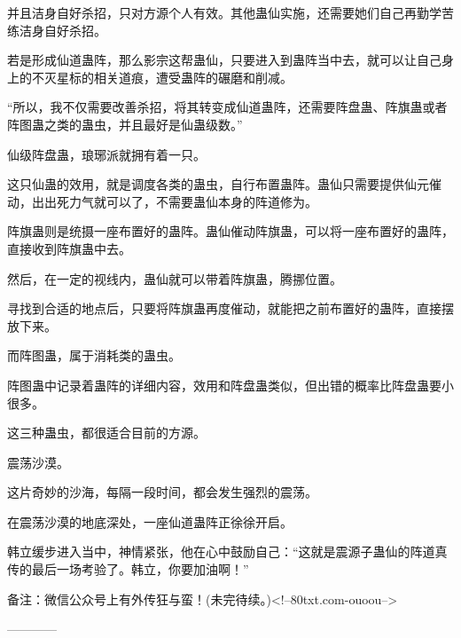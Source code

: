\begin{this_body}
并且洁身自好杀招，只对方源个人有效。其他蛊仙实施，还需要她们自己再勤学苦练洁身自好杀招。

若是形成仙道蛊阵，那么影宗这帮蛊仙，只要进入到蛊阵当中去，就可以让自己身上的不灭星标的相关道痕，遭受蛊阵的碾磨和削减。

“所以，我不仅需要改善杀招，将其转变成仙道蛊阵，还需要阵盘蛊、阵旗蛊或者阵图蛊之类的蛊虫，并且最好是仙蛊级数。”

仙级阵盘蛊，琅琊派就拥有着一只。

这只仙蛊的效用，就是调度各类的蛊虫，自行布置蛊阵。蛊仙只需要提供仙元催动，出出死力气就可以了，不需要蛊仙本身的阵道修为。

阵旗蛊则是统摄一座布置好的蛊阵。蛊仙催动阵旗蛊，可以将一座布置好的蛊阵，直接收到阵旗蛊中去。

然后，在一定的视线内，蛊仙就可以带着阵旗蛊，腾挪位置。

寻找到合适的地点后，只要将阵旗蛊再度催动，就能把之前布置好的蛊阵，直接摆放下来。

而阵图蛊，属于消耗类的蛊虫。

阵图蛊中记录着蛊阵的详细内容，效用和阵盘蛊类似，但出错的概率比阵盘蛊要小很多。

这三种蛊虫，都很适合目前的方源。

震荡沙漠。

这片奇妙的沙海，每隔一段时间，都会发生强烈的震荡。

在震荡沙漠的地底深处，一座仙道蛊阵正徐徐开启。

韩立缓步进入当中，神情紧张，他在心中鼓励自己：“这就是震源子蛊仙的阵道真传的最后一场考验了。韩立，你要加油啊！”

备注：微信公众号上有外传狂与蛮！(未完待续。)<!--80txt.com-ouoou-->

------------

\end{this_body}

